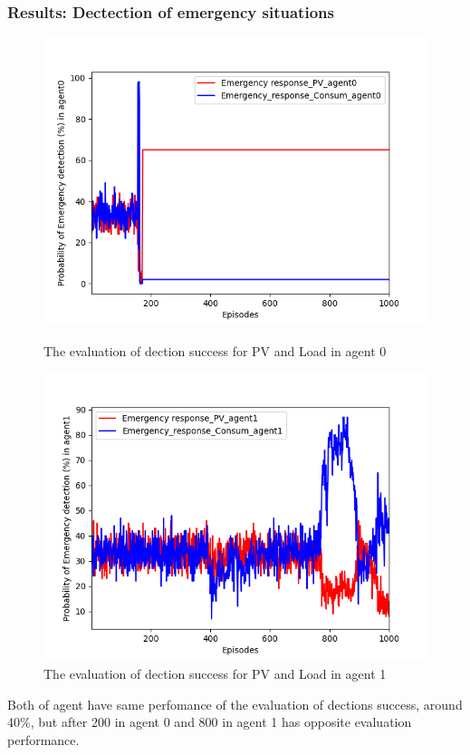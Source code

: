 \documentclass{beamer}
\begin{document}
\begin{frame}
\frametitle{Results: Dectection of emergency situations}
    \begin{figure}
\centering
    \begin{minipage}{.475\textwidth}
    \centering
   \includegraphics[scale=0.25]{presentation/result_2_v1.png}
   \caption{The evaluation of dection success for PV and Load in agent 0}
   \end{minipage}
    \begin{minipage}{.475\textwidth}
   \centering
   \includegraphics[scale=0.25]{presentation/result_2_v2.png}
   \caption{The evaluation of dection success for PV and Load in agent 1}
   \end{minipage}
\end{figure}
\bit
\item Both of agent have same perfomance of the evaluation of dections success, around 40\%, but after 200 in agent 0 and 800 in agent 1 has opposite evaluation performance. 
\eit
\end{frame}
\end{document}
